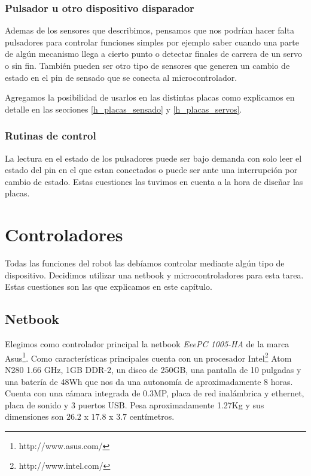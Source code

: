 \subsubsection{Pulsador u otro dispositivo disparador}
\label{h_sensado_pulsador}

Ademas de los sensores que describimos, pensamos que nos podr\'ian hacer falta pulsadores para controlar funciones
simples por ejemplo saber cuando una parte de alg\'un mecanismo llega a cierto punto o detectar finales de carrera
de un servo o sin fin.
Tambi\'en pueden ser otro tipo de sensores que generen un cambio de estado en el pin de sensado que se conecta al
microcontrolador.

Agregamos la posibilidad de usarlos en las distintas placas como explicamos en detalle en las secciones
\ref{h_placas_sensado} y \ref{h_placas_servos}.

\subsubsection{Rutinas de control}
\label{h_sensado_pulsador_rutinas}

La lectura en el estado de los pulsadores puede ser bajo demanda con solo leer el estado del pin en el que estan
conectados o puede ser ante una interrupci\'on por cambio de estado.
Estas cuestiones las tuvimos en cuenta a la hora de dise\~nar las placas.

\section{Controladores}
\label{h_controlador}

Todas las funciones del robot las deb\'iamos controlar mediante alg\'un tipo de dispositivo.
Decidimos utilizar una netbook y microcontroladores para esta tarea.
Estas cuestiones son las que explicamos en este cap\'itulo.

\subsection{Netbook}
\label{h_controlador_netbook}

Elegimos como controlador principal la netbook \emph{EeePC 1005-HA} de la marca Asus\footnote{http://www.asus.com/}.
Como caracter\'isticas principales cuenta con un procesador Intel\footnote{http://www.intel.com/} Atom N280 1.66 GHz, 1GB DDR-2, un disco de
250GB, una pantalla de 10 pulgadas y una bater\'ia de 48Wh que nos da una autonom\'ia de aproximadamente 8 horas.
Cuenta con una c\'amara integrada de 0.3MP, placa de red inal\'ambrica y ethernet, placa de sonido y 3 puertos USB.
Pesa aproximadamente 1.27Kg y sus dimensiones son $26.2$ x $17.8$ x $3.7$ cent\'imetros.


